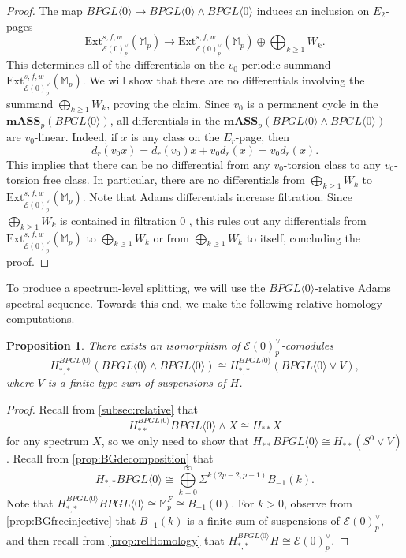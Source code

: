 \documentclass{amsart}
\newtheorem{proposition}[theorem]{Proposition}
\theoremstyle{plain}
\numberwithin{theorem}{section}
\numberwithin{equation}{section}
\numberwithin{figure}{section}
\newcommand{\cE}{{\mathcal E}}
\newcommand{\0}{\langle 0 \rangle }
\begin{document}
\begin{proof}
    The map $BPGL \langle 0 \rangle \to BPGL \langle0 \rangle \wedge BPGL \langle 0 \rangle$ induces an inclusion on $E_2$-pages
    \[\text{Ext}^{s,f,w}_{\mathcal{E}(0)_p^\vee}(\mathbb{M}_p) \to \text{Ext}^{s,f,w}_{\mathcal{E}(0)_p^\vee}(\mathbb{M}_p) \oplus \bigoplus_{k \geq 1} W_k.\]
    This determines all of the differentials on the $v_0$-periodic summand $\text{Ext}^{s,f,w}_{\mathcal{E}(0)^\vee_p}(\mathbb{M}_p)$. We will show that there are no differentials involving the summand $\bigoplus_{k \geq 1}W_k$, proving the claim. Since $v_0$ is a permanent cycle in the $\textbf{mASS}_p(BPGL \langle 0 \rangle)$, all differentials in the $\textbf{mASS}_p(BPGL \langle 0 \rangle \wedge BPGL \langle 0 \rangle)$ are $v_0$-linear. Indeed, if $x$ is any class on the $E_r$-page, then
    \[d_r(v_0x) = d_r(v_0)x + v_0d_r(x) = v_0d_r(x).\]
    This implies that there can be no differential from any $v_0$-torsion class to any $v_0$-torsion free class. In particular, there are no differentials from $\bigoplus_{k \geq 1}W_k$ to $\text{Ext}^{s,f,w}_{\mathcal{E}(0)_p^\vee}(\mathbb{M}_p)$. Note that Adams differentials increase filtration. Since $\bigoplus_{k \geq 1}W_k$ is contained in filtration 0 , this rules out any differentials from $\text{Ext}^{s,f,w}_{\mathcal{E}(0)_p^\vee}(\mathbb{M}_p)$ to $\bigoplus_{k \geq 1}W_k$ or from $\bigoplus_{k \geq 1}W_k$ to itself, concluding the proof.
\end{proof}

To produce a spectrum-level splitting, we will use the $BPGL \langle 0 \rangle$-relative Adams spectral sequence. Towards this end, we make the following relative homology computations.
\begin{proposition}\label{prop:homology splitting height zero}
    There exists an isomorphism of $\cE(0)_p^\vee$-comodules \[ H_{*,*}^{BPGL\langle 0 \rangle}\left( BPGL\langle 0 \rangle \wedge BPGL\langle 0 \rangle \right) \cong H_{*,*}^{BPGL\langle 0 \rangle}\left(BPGL\langle 0 \rangle \vee V \right) ,\]
where $V$ is a finite-type sum of suspensions of $H$.
\end{proposition}
\begin{proof}
Recall from \cref{subsec:relative} that $$H_{**}^{BPGL\langle 0 \rangle}BPGL\langle 0 \rangle \wedge X \cong H_{**}X$$ for any spectrum $X$, so we only need to show that $H_{**}BPGL\langle 0 \rangle \cong H_{**}(S^0 \vee V)$. Recall from \cref{prop:BGdecomposition} that 
\[H_{*,*}BPGL\langle 0 \rangle \cong \bigoplus\limits_{k=0}^{\infty}\Sigma^{k(2p-2, p-1)}B_{-1}(k).\]
Note that $H_{*,*}^{BPGL \langle 0 \rangle}BPGL\langle 0 \rangle \cong \mathbb{M}_p^F \cong B_{-1}(0)$. For $k > 0$, observe from  \cref{prop:BGfreeinjective} that $B_{-1}(k)$ is a finite sum of suspensions of $\cE(0)_p^{\vee}$, and then recall from \cref{prop:relHomology} that  $H_{*,*}^{BPGL\langle 0 \rangle}H \cong \cE(0)_p^\vee$.
 \end{proof}
\end{document}
